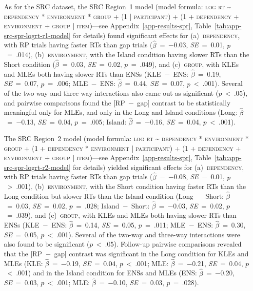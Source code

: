 As for the SRC dataset, the SRC Region~1 model (model formula: \textsc{log rt \~{} dependency * environment * group + (1 | participant) + (1 + dependency + environment + group | item)}---see Appendix~\ref{app-results-spr}, Table~\ref{tab:app-src-spr-logrt-r1-model} for details) found significant effects for (a)~\textsc{dependency}, with RP trials having faster RTs than gap trials ($\hat{\beta}$~=~−0.03, \textit{SE}~=~0.01, $p$~=~.014), (b)~\textsc{environment}, with the Island condition having slower RTs than the Short condition ($\hat{\beta}$~=~0.03, \textit{SE}~=~0.02, $p$~=~.049), and (c)~\textsc{group}, with KLEs and MLEs both having slower RTs than ENSs (KLE~−~ENS: $\hat{\beta}$~=~0.19, \textit{SE}~=~0.07, $p$~=~.006; MLE~−~ENS: $\hat{\beta}$~=~0.44, \textit{SE}~=~0.07, $p$~<~.001). Several of the two-way and three-way interactions also came out as significant ($p$~<~.05), and pairwise comparisons found the [RP~−~gap] contrast to be statistically meaningful only for MLEs, and only in the Long and Island conditions (Long: $\hat{\beta}$~=~−0.13, \textit{SE}~=~0.04, $p$~=~.005; Island: $\hat{\beta}$~=~−0.16, \textit{SE}~=~0.04, $p$~<~.001).

The SRC Region~2 model (model formula: \textsc{log rt \~{} dependency * environment * group + (1 + dependency * environment | participant) + (1 + dependency + environment + group | item)}---see Appendix~\ref{app-results-spr}, Table~\ref{tab:app-src-spr-logrt-r2-model} for details) yielded significant effects for (a)~\textsc{dependency}, with RP trials having faster RTs than gap trials ($\hat{\beta}$~=~−0.08, \textit{SE}~=~0.01, $p$~>~.001), (b)~\textsc{environment}, with the Short condition having faster RTs than the Long condition but slower RTs than the Island condition (Long~−~Short: $\hat{\beta}$~=~0.03, \textit{SE}~=~0.02, $p$~=~.028; Island~−~Short: $\hat{\beta}$~=~−0.03, \textit{SE}~=~0.02, $p$~=~.039), and (c)~\textsc{group}, with KLEs and MLEs both having slower RTs than ENSs (KLE~−~ENS: $\hat{\beta}$~=~0.14, \textit{SE}~=~0.05, $p$~=~.011; MLE~−~ENS: $\hat{\beta}$~=~0.30, \textit{SE}~=~0.05, $p$~<~.001). Several of the two-way and three-way interactions were also found to be significant ($p$~<~.05). Follow-up pairwise comparisons revealed that the [RP~−~gap] contrast was significant in the Long condition for KLEs and MLEs (KLE: $\hat{\beta}$~=~−0.19, \textit{SE}~=~0.04, $p$~<~.001; MLE: $\hat{\beta}$~=~−0.21, \textit{SE}~=~0.04, $p$~<~.001) and in the Island condition for ENSs and MLEs (ENS: $\hat{\beta}$~=~−0.20, \textit{SE}~=~0.03, $p$~<~.001; MLE: $\hat{\beta}$~=~−0.10, \textit{SE}~=~0.03, $p$~=~.028).

